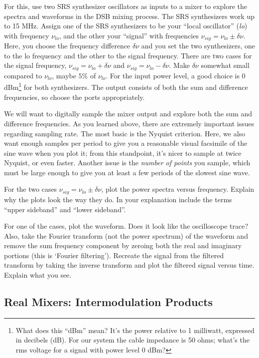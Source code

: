 \documentclass[12pt,preprint]{aastex}
\begin{document}
For this, use two SRS synthesizer oscillators as inputs to a mixer to
explore the spectra and waveforms in the DSB mixing process.  The SRS
synthesizers work up to 15 MHz.  Assign one of the SRS synthesizers to
be your ``local oscillator'' ({\it lo}) with frequency $\nu_{lo}$, and
the other your ``signal'' with frequencies $\nu_{sig} = \nu_{lo} \pm
\delta \nu$.  Here, you choose the frequency difference $\delta \nu$ and
you set the two synthesizers, one to the lo frequency and the other to
the signal frequency. There are two cases for the signal frequency,
$\nu_{sig} = \nu_{lo} + \delta \nu$ and $\nu_{sig} = \nu_{lo} - \delta
\nu$.  Make $\delta \nu$ somewhat small compared to $\nu_{lo}$, maybe
$5\%$ of $\nu_{lo}$.  For the input power level, a good choice is 0
dBm\footnote{What does this ``dBm'' mean? It's the power relative to 1
  milliwatt, expressed in decibels (dB). For our system the cable
  impedance is 50 ohms; what's the rms voltage for a signal with power
  level 0 dBm?} for both synthesizers. The output consists of both the
sum and difference frequencies, so choose the ports appropriately.

We will want to digitally sample the mixer output and explore both the
sum and difference frequencies. As you learned above, there are
extremely important issues regarding sampling rate. The most basic is
the Nyquist criterion. Here, we also want enough samples per period to
give you a reasonable visual facsimile of the sine wave when you plot
it; from this standpoint, it's nicer to sample at twice
Nyquist, or even faster.  Another issue is the {\it number of points}
you sample, which must be large enough to give you at least a few
periods of the slowest sine wave.

For the two cases $\nu_{sig} = \nu_{lo} \pm \delta \nu$, plot the power
spectra versus frequency. Explain why the plots look the way they do. In
your explanation include the terms ``upper sideband'' and ``lower
sideband''.

For one of the cases, plot the waveform.  Does it look like the
oscilloscope trace? Also, take the Fourier transform (not the power
spectrum) of the waveform and remove the sum frequency component by
zeroing both the real and imaginary portions (this is `Fourier
filtering').  Recreate the signal from the filtered transform by taking
the inverse transform and plot the filtered signal versus time.  Explain
what you see.

\subsection{Real Mixers: Intermodulation Products}
\end{document}
